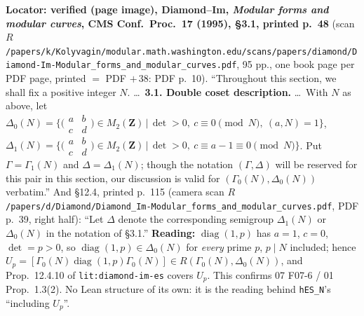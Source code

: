 \begin{hypothesis}\label{lit:hz-diamond-im-delta0}
  \textbf{Locator: verified (page image), Diamond--Im, \emph{Modular forms and modular curves}, CMS Conf.\ Proc.\ 17 (1995),
  \S3.1, printed p.~48} (scan $R$\texttt{/papers/k/Kolyvagin/modular.math.washington.edu/scans/papers/diamond/Diamond-Im-Modular\_forms\_and\_modular\_curves.pdf},
  95 pp., one book page per PDF page, printed $=$ PDF $+\,38$: PDF p.~10). ``Throughout this section, we shall fix a positive integer
  $N$. \dots\ \textbf{3.1. Double coset description.} \dots\ With $N$ as above, let
  $\Delta_0(N)=\bigl\{\bigl(\begin{smallmatrix}a&b\\c&d\end{smallmatrix}\bigr)\in M_2(\mathbf Z)\,\big|\,\det>0,\ c\equiv0\pmod N,\ (a,N)=1\bigr\}$,
  $\Delta_1(N)=\bigl\{\bigl(\begin{smallmatrix}a&b\\c&d\end{smallmatrix}\bigr)\in M_2(\mathbf Z)\,\big|\,\det>0,\ c\equiv a-1\equiv0\pmod N\bigr\}$.
  Put $\Gamma=\Gamma_1(N)$ and $\Delta=\Delta_1(N)$; though the notation $(\Gamma,\Delta)$ will be reserved for this pair in this section, our
  discussion is valid for $(\Gamma_0(N),\Delta_0(N))$ verbatim.'' And \S12.4, printed p.~115 (camera scan
  $R$\texttt{/papers/d/Diamond/Diamond\_Im-Modular\_forms\_and\_modular\_curves.pdf}, PDF p.~39, right half): ``Let $\Delta$ denote the
  corresponding semigroup $\Delta_1(N)$ or $\Delta_0(N)$ in the notation of \S3.1.''
  \textbf{Reading:} $\operatorname{diag}(1,p)$ has $a=1$, $c=0$, $\det=p>0$, so $\operatorname{diag}(1,p)\in\Delta_0(N)$ for \emph{every} prime $p$,
  $p\mid N$ included; hence $U_p=[\Gamma_0(N)\operatorname{diag}(1,p)\Gamma_0(N)]\in R(\Gamma_0(N),\Delta_0(N))$, and Prop.~12.4.10 of
  \texttt{lit:diamond-im-es} covers $U_p$. This confirms 07 F07-6 / 01 Prop.~1.3(2). No Lean structure of its own: it is the
  reading behind \texttt{hES\_N}'s ``including $U_p$''.
\end{hypothesis}

